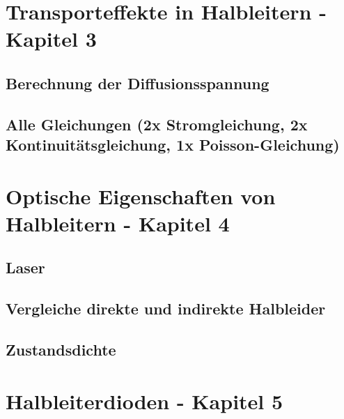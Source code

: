 \documentclass{article}
\begin{document}
\section{Transporteffekte in Halbleitern - Kapitel 3}

\subsection{Berechnung der Diffusionsspannung}\label{kX:diffusion}
\subsection{Alle Gleichungen (2x Stromgleichung, 2x Kontinuitätsgleichung, 1x Poisson-Gleichung)}\label{kX:alleGleichungen}

\section{Optische Eigenschaften von Halbleitern - Kapitel 4}

\subsection{Laser}\label{k4:laser}
\subsection{Vergleiche direkte und indirekte Halbleider}\label{k4:inUndIndirekt}
\subsection{Zustandsdichte}\label{kX:zustandsDichte}


\section{Halbleiterdioden - Kapitel 5}
\end{document}
